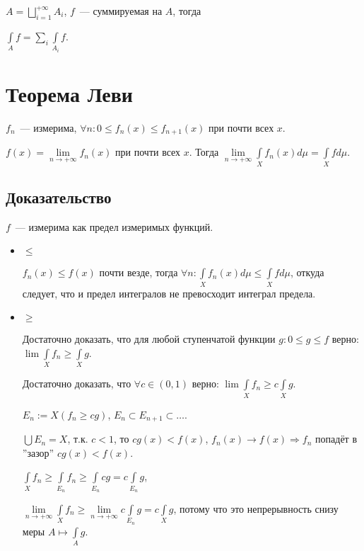 \documentclass{article}
\begin{document}
            $A = \bigsqcup\limits_{i = 1}^{+\infty} A_i$, $f$~--- суммируемая на $A$, тогда 
        
            $\int\limits_{A} f = \sum\limits_{i} \int\limits_{A_i} f$.

\newpage

    \section{Теорема Леви}
    
        $f_n$~--- измерима, $\forall n : 0 \leqslant f_n(x) \leqslant f_{n + 1} (x)$ при почти всех $x$.
        
        $f(x) = \lim\limits_{n \rightarrow +\infty} f_n(x)$ при почти всех $x$. Тогда $\lim\limits_{n \rightarrow +\infty} \int\limits_{X} f_n(x) d \mu = \int\limits_{X} f d \mu$.
        
        \subsection{Доказательство}
        
            $f$~--- измерима как предел измеримых функций.
            
            \begin{itemize}
            
                \item $\leqslant$
                
                    $f_n(x) \leqslant f(x)$ почти везде, тогда $\forall n : \int\limits_{X} f_n(x) d \mu \leqslant \int\limits_{X} f d \mu$, откуда следует, что и предел интегралов не превосходит интеграл предела.
                    
                \item $\geqslant$
                
                    Достаточно доказать, что для любой ступенчатой функции $g : 0 \leqslant g \leqslant f$ верно: $\lim \int\limits_{X} f_n \geqslant \int\limits_{X} g$.
                    
                    Достаточно доказать, что $\forall c \in (0, 1)$ верно: $\lim \int\limits_{X} f_n \geqslant c \int\limits_{X} g$.
                    
                    $E_n := X \left( f_n \geqslant cg \right)$, $E_n \subset E_{n + 1} \subset \ldots$.
                    
                    $\bigcup E_n = X$, т.к. $c < 1$, то $c g(x) < f(x)$, $f_n(x) \rightarrow f(x) \Rightarrow f_n$ попадёт в ''зазор'' $c g(x) < f(x)$.
                    
                    $\int\limits_{X} f_n \geqslant \int\limits_{E_n} f_n \geqslant \int\limits_{E_n} c g = c \int\limits_{E_n} g$,
                    
                    $\lim\limits_{n \rightarrow +\infty} \int\limits_{X} f_n \geqslant \lim\limits_{n \rightarrow +\infty} c \int\limits_{E_n} g = c \int\limits_{X} g$, потому что это непрерывность снизу меры $A \longmapsto \int\limits_{A} g$.
                    
            \end{itemize}
    
\end{document}
